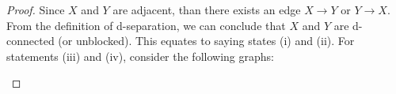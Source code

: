 \documentclass{amsart}
\theoremstyle{plain}
\begin{document}
\begin{proof}
  Since $X$ and $Y$ are adjacent, than there exists an edge $X\rightarrow Y$ or $Y\rightarrow X$.
  From the definition of d-separation, we can conclude that $X$ and $Y$ are d-connected (or
  unblocked). This equates to saying states (i) and (ii). For statements (iii) and (iv), consider
  the following graphs:

  \begin{figure}[h]
  \end{figure}


\end{proof}
\end{document}
